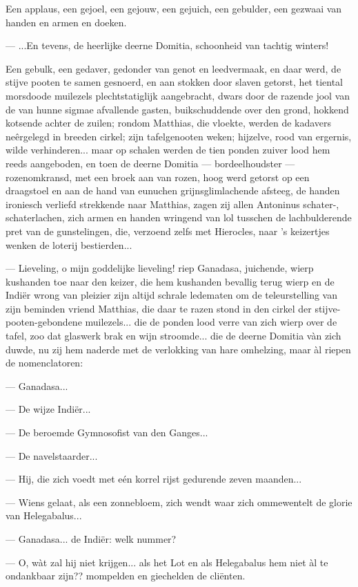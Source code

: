 \documentclass[a4paper, 12pt, oneside, dutch]{article}
\begin{document}
Een applaus, een gejoel, een gejouw, een gejuich, een gebulder, een gezwaai van handen en armen en doeken.

--- ...En tevens, de heerlijke deerne Domitia, schoonheid van tachtig winters!

Een gebulk, een gedaver, gedonder van genot en leedvermaak, en daar werd, de stijve pooten te samen gesnoerd, en aan stokken door slaven getorst, het tiental morsdoode muilezels plechtstatiglijk aangebracht, dwars door de razende jool van de van hunne sigmae afvallende gasten, buikschuddende over den grond, hokkend kotsende achter de zuilen; rondom Matthias, die vloekte, werden de kadavers neêrgelegd in breeden cirkel; zijn tafelgenooten weken; hijzelve, rood van ergernis, wilde verhinderen... maar op schalen werden de tien ponden zuiver lood hem reeds aangeboden, en toen de deerne Domitia --- bordeelhoudster --- rozenomkransd, met een broek aan van rozen, hoog werd getorst op een draagstoel en aan de hand van eunuchen grijnsglimlachende afsteeg, de handen ironiesch verliefd strekkende naar Matthias, zagen zij allen Antoninus schater-, schaterlachen, zich armen en handen wringend van lol tusschen de lachbulderende pret van de gunstelingen, die, verzoend zelfs met Hierocles, naar 's keizertjes wenken de loterij bestierden...

--- Lieveling, o mijn goddelijke lieveling! riep Ganadasa, juichende, wierp kushanden toe naar den keizer, die hem kushanden bevallig terug wierp en de Indiër wrong van pleizier zijn altijd schrale ledematen om de teleurstelling van zijn beminden vriend Matthias, die daar te razen stond in den cirkel der stijve-pooten-gebondene muilezels... die de ponden lood verre van zich wierp over de tafel, zoo dat glaswerk brak en wijn stroomde... die de deerne Domitia vàn zich duwde, nu zij hem naderde met de verlokking van hare omhelzing, maar àl riepen de nomenclatoren:

--- Ganadasa...

--- De wijze Indiër...

--- De beroemde Gymnosofist van den Ganges...

--- De navelstaarder...

--- Hij, die zich voedt met eén korrel rijst gedurende zeven maanden...

--- Wiens gelaat, als een zonnebloem, zich wendt waar zich ommewentelt de glorie van Helegabalus...

--- Ganadasa... de Indiër: welk nummer?

--- O, wàt zal hij niet krijgen... als het Lot en als Helegabalus hem niet àl te ondankbaar zijn?? mompelden en giechelden de cliënten.
\end{document}
